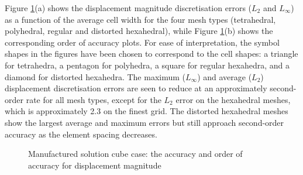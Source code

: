 \documentclass[sn-mathphys,Numbered]{sn-jnl}%
\begin{document}
Figure \ref{fig:mms_disp_accuracy}(a) shows the displacement magnitude discretisation errors ($L_2$ and $L_\infty$) as a function of the average cell width for the four mesh types (tetrahedral, polyhedral, regular and distorted hexahedral), while Figure \ref{fig:mms_disp_accuracy}(b) shows the corresponding order of accuracy plots.
For ease of interpretation, the symbol shapes in the figures have been chosen to correspond to the cell shapes: a triangle for tetrahedra, a pentagon for polyhedra, a square for regular hexahedra, and a diamond for distorted hexahedra.
The maximum ($L_\infty$) and average ($L_2$) displacement discretisation errors are seen to reduce at an approximately second-order rate for all mesh types, except for the $L_2$ error on the hexahedral meshes, which is approximately 2.3 on the finest grid.
The distorted hexahedral meshes show the largest average and maximum errors but still approach second-order accuracy as the element spacing decreases.
\begin{figure}[htbp]
	\centering
	\caption{Manufactured solution cube case: the accuracy and order of accuracy for displacement magnitude}
	\label{fig:mms_disp_accuracy}
\end{figure}
\end{document}
